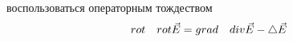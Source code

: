  \label{sec:wave_equation}
  воспользоваться операторным тождеством
 \begin{equation}
   rot \quad rot \vec{E} = grad \quad div \vec{E} - \mathop{}\!\mathbin\bigtriangleup \vec{E}
  \end{equation}


%
%
%
%
%
%
